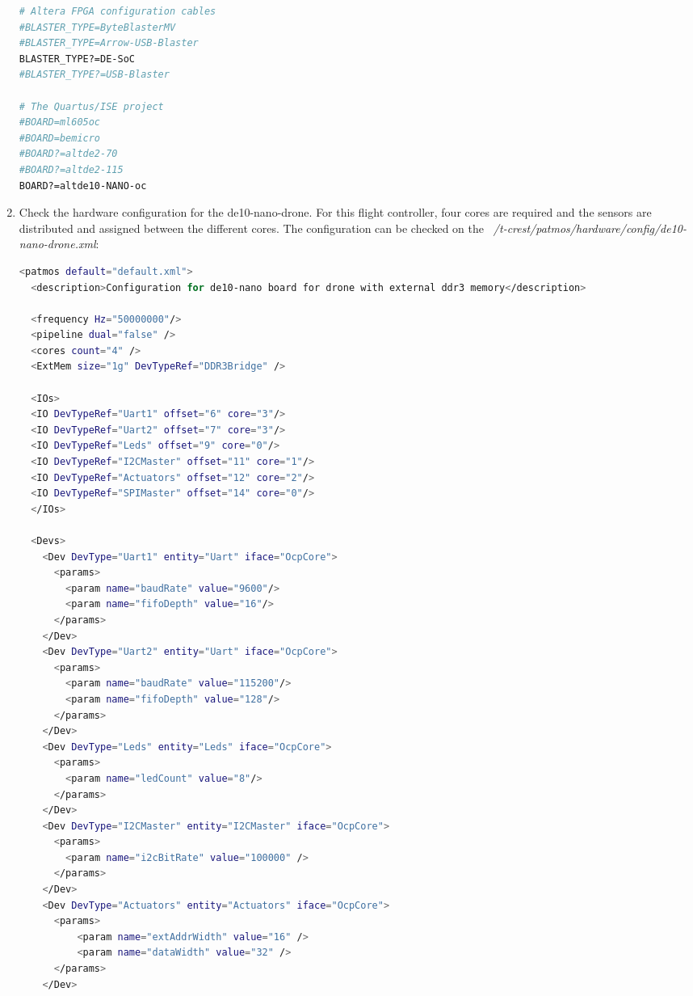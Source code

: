\begin{enumerate}
\lstset{style=Bstyle}
\begin{lstlisting}[language=bash]
# Altera FPGA configuration cables
#BLASTER_TYPE=ByteBlasterMV
#BLASTER_TYPE=Arrow-USB-Blaster
BLASTER_TYPE?=DE-SoC 
#BLASTER_TYPE?=USB-Blaster

# The Quartus/ISE project
#BOARD=ml605oc
#BOARD=bemicro
#BOARD?=altde2-70
#BOARD?=altde2-115
BOARD?=altde10-NANO-oc
\end{lstlisting} 
    
    \item Check the hardware configuration for the de10-nano-drone. For this flight controller, four cores are required and the sensors are distributed and assigned between the different cores. The configuration can be checked on the \textit{~/t-crest/patmos/hardware/config/de10-nano-drone.xml}:
    
\lstset{style=Bstyle}
\begin{lstlisting}[language=bash]
<patmos default="default.xml">
  <description>Configuration for de10-nano board for drone with external ddr3 memory</description>

  <frequency Hz="50000000"/>
  <pipeline dual="false" />
  <cores count="4" />
  <ExtMem size="1g" DevTypeRef="DDR3Bridge" />

  <IOs>
  <IO DevTypeRef="Uart1" offset="6" core="3"/>
  <IO DevTypeRef="Uart2" offset="7" core="3"/>
  <IO DevTypeRef="Leds" offset="9" core="0"/>
  <IO DevTypeRef="I2CMaster" offset="11" core="1"/>
  <IO DevTypeRef="Actuators" offset="12" core="2"/>
  <IO DevTypeRef="SPIMaster" offset="14" core="0"/>
  </IOs>

  <Devs>
    <Dev DevType="Uart1" entity="Uart" iface="OcpCore">
      <params>
        <param name="baudRate" value="9600"/>
        <param name="fifoDepth" value="16"/>
      </params>
    </Dev>
    <Dev DevType="Uart2" entity="Uart" iface="OcpCore">
      <params>
        <param name="baudRate" value="115200"/>
        <param name="fifoDepth" value="128"/>
      </params>
    </Dev>
    <Dev DevType="Leds" entity="Leds" iface="OcpCore">
      <params>
        <param name="ledCount" value="8"/>
      </params>
    </Dev>
    <Dev DevType="I2CMaster" entity="I2CMaster" iface="OcpCore">
      <params>
        <param name="i2cBitRate" value="100000" />
      </params>
    </Dev>
    <Dev DevType="Actuators" entity="Actuators" iface="OcpCore">
      <params>
          <param name="extAddrWidth" value="16" />
          <param name="dataWidth" value="32" />
      </params>
    </Dev>


\end{lstlisting}
\end{enumerate}
